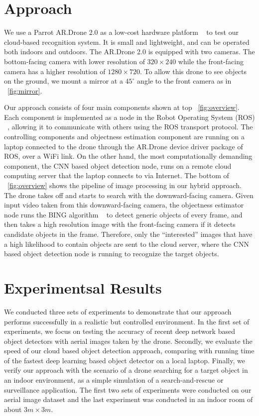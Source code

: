 \section{Approach}
We use a Parrot AR.Drone 2.0 as a low-cost hardware platform ~\cite{c29}
to test our cloud-based recognition system. It is small and lightweight, and can be operated both indoors and outdoors.
The AR.Drone 2.0 is equipped with two cameras. 
The bottom-facing camera with lower resolution of $320 \times 240$ while the front-facing camera has a higher resolution of $1280 \times 720$. 
To allow this drone to see objects on the ground, we mount a mirror at a $45^{\circ}$ angle to the front camera as in ~\ref{fig:mirror}.

Our approach consists of four main components shown at top ~\ref{fig:overview}. Each component is implemented as a node in the Robot Operating System (ROS) ~\cite{c30}, allowing it to communicate with others using the ROS transport protocol.
The controlling components and objectness estimation component are running on a laptop connected to the drone through the AR.Drone device driver package of ROS, over a WiFi link. On the other hand, the most computationally demanding component, the CNN based object detection node, runs on a remote cloud computing server that the laptop connects to via Internet.
The bottom of ~\ref{fig:overview} shows the pipeline of image processing in our hybrid approach. 
The drone takes off and starts to search with the downward-facing camera. 
Given input video taken from this downward-facing camera, the objectness estimator node runs the BING algorithm ~\cite{c28} to detect generic objects of every frame, and then takes a high resolution image with the front-facing camera if it detects candidate objects in the frame.
Therefore, only the ``interested'' images that have a high likelihood to contain objects are sent to the cloud server, where the CNN based object detection node is running to recognize the target objects.

\section{Experimentsal Results}
We conducted three sets of experiments to demonstrate that our approach performs successfully in a realistic but controlled environment. 
In the first set of experiments, we focus on testing the accuracy of recent deep network based object detectors with aerial images taken by the drone.
Secondly, we evaluate the speed of our cloud based object detection approach, comparing with running time of the fastest deep learning based object detector on a local laptop. Finally, we verify our approach with the scenario of a drone searching for a target object in an indoor environment, as a simple simulation of a search-and-rescue or surveillance application. 
The first two sets of experiments were conducted on our aerial image dataset and the last experiment was conducted in an indoor room of about $3m \times 3m$.

